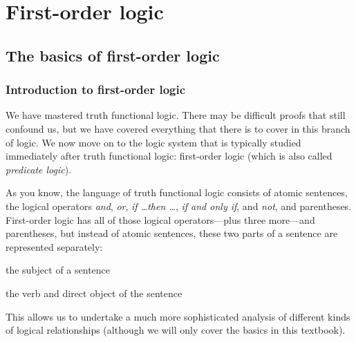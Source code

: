 \graphicspath{{figures--proofs/}}
\part{First-order logic}
\label{ch.FOL}

\chapter{The basics of first-order logic}\label{FOL-basics}

\section{Introduction to first-order logic}

We have mastered truth functional logic. There may be difficult proofs that still confound us, but we have covered everything that there is to cover in this branch of logic. We now move on to the logic system that is typically studied immediately after truth functional logic: first-order logic (which is also called \textit{predicate logic}). 

As you know, the language of truth functional logic consists of atomic sentences, the logical operators \textit{and}, \textit{or}, \textit{if \ldots then \ldots}, \textit{if and only if}, and \textit{not}, and parentheses. First-order logic has all of those logical operators---plus three more---and parentheses, but instead of atomic sentences, these two parts of a sentence are represented separately: 
\begin{ebullet}
\item[(\textit{a})] the subject of a sentence
\item[(\textit{b})] the verb and direct object of the sentence
\end{ebullet}
This allows us to undertake a much more sophisticated analysis of different kinds of logical relationships (although we will only cover the basics in this textbook). 


